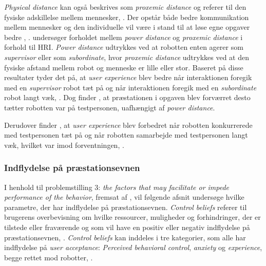 \textit{Physical distance} kan også beskrives som \textit{proxemic distance} og referer til den fysiske adskillelse mellem mennesker, \parencite[s. 784]{PDF:HowSocialDistanceShapesHRI}. Der opstår både bedre kommunikation mellem mennesker og den individuelle vil være i stand til at løse egne opgaver bedre , \parencite[s. 785]{PDF:HowSocialDistanceShapesHRI}.\blankline
%
\textcite[s. 794]{PDF:HowSocialDistanceShapesHRI} undersøger forholdet mellem \textit{power distance} og \textit{proxemic distance} i forhold til HRI. \textit{Power distance} udtrykkes ved at robotten enten agerer som \textit{supervisor} eller som \textit{subordinate}, hvor \textit{proxemic distance} udtrykkes ved at den fysiske afstand mellem robot og menneske er lille eller stor. Baseret på disse resultater tyder det på, at \textit{user experience} blev bedre når interaktionen foregik med en \textit{supervisor} robot tæt på og når interaktionen foregik med en \textit{subordinate} robot langt væk, \parencite[s. 785]{PDF:HowSocialDistanceShapesHRI}. Dog finder \textcite[s. 785]{PDF:HowSocialDistanceShapesHRI}, at præstationen i opgaven blev forværret desto tætter robotten var på testpersonen, uafhængigt af \textit{power distance}. 

Derudover finder \textcite[s. 785]{PDF:HowSocialDistanceShapesHRI}, at \textit{user experience} blev forbedret når robotten konkurrerede med testpersonen tæt på og når robotten samarbejde med testpersonen langt væk, hvilket var imod forventningen, \parencite[s. 785]{PDF:HowSocialDistanceShapesHRI}.   
%
\subsubsection*{Indflydelse på præstationsevnen}
\label{InteraktionSocialeRobotterParametrePraestation}
%
I henhold til problemstilling 3: \textit{the factors that may facilitate or impede performance of the behavior}, fremsat af \textcite[s. 1477]{PDF:SharingALifeHarvey}, vil følgende afsnit undersøge hvilke parametre, der har indflydelse på præstationsevnen.\blankline
%
\textit{Control beliefs} referer til brugerens overbevisning om hvilke ressourcer, muligheder og forhindringer, der er tilstede eller fraværende og som vil have en positiv eller negativ indflydelse på præstationsevnen, \parencite[s. 1478]{PDF:ExploringInfluencingVariable}. \textit{Control beliefs} kan inddeles i tre kategorier, som alle har indflydelse på \textit{user acceptance}: \textit{Perceived behavioral control}, \textit{anxiety} og \textit{experience}, begge rettet mod robotter, \parencite[s. 1478]{PDF:ExploringInfluencingVariable}. 

